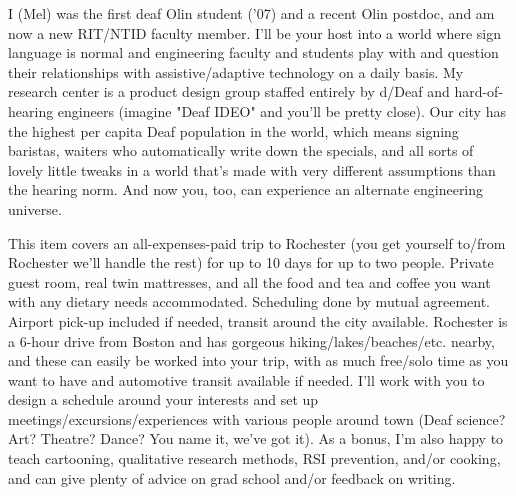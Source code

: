 \documentclass[11pt]{article}
\begin{document}
I (Mel) was the first deaf Olin student ('07) and a recent Olin postdoc, and am now a new RIT/NTID faculty member. I'll be your host into a world where sign language is normal and engineering faculty and students play with and question their relationships with assistive/adaptive technology on a daily basis. My research center is a product design group staffed entirely by d/Deaf and hard-of-hearing engineers (imagine "Deaf IDEO" and you'll be pretty close). Our city has the highest per capita Deaf population in the world, which means signing baristas, waiters who automatically write down the specials, and all sorts of lovely little tweaks in a world that's made with very different assumptions than the hearing norm. And now you, too, can experience an alternate engineering universe.

This item covers an all-expenses-paid trip to Rochester (you get yourself to/from Rochester we'll handle the rest) for up to 10 days for up to two people. Private guest room, real twin mattresses, and all the food and tea and coffee you want with any dietary needs accommodated. Scheduling done by mutual agreement. Airport pick-up included if needed, transit around the city available. Rochester is a 6-hour drive from Boston and has gorgeous hiking/lakes/beaches/etc. nearby, and these can easily be worked into your trip, with as much free/solo time as you want to have and automotive transit available if needed. I'll work with you to design a schedule around your interests and set up meetings/excursions/experiences with various people around town (Deaf science? Art? Theatre? Dance? You name it, we've got it). As a bonus, I'm also happy to teach cartooning, qualitative research methods, RSI prevention, and/or cooking, and can give plenty of advice on grad school and/or feedback on writing.
\end{document}
